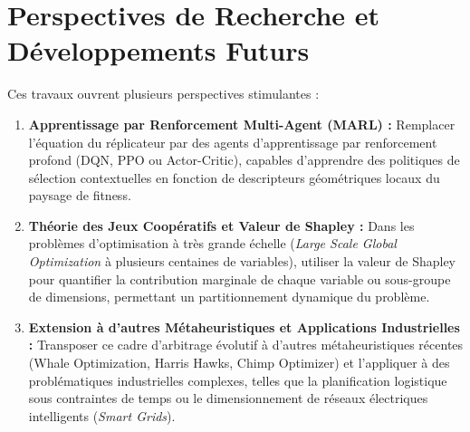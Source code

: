 \section{Perspectives de Recherche et Développements Futurs}
Ces travaux ouvrent plusieurs perspectives stimulantes :
\begin{enumerate}[label=\textbf{\arabic*.}]
    \item \textbf{Apprentissage par Renforcement Multi-Agent (MARL) :} Remplacer l'équation du réplicateur par des agents d'apprentissage par renforcement profond (DQN, PPO ou Actor-Critic), capables d'apprendre des politiques de sélection contextuelles en fonction de descripteurs géométriques locaux du paysage de fitness.
    \item \textbf{Théorie des Jeux Coopératifs et Valeur de Shapley :} Dans les problèmes d'optimisation à très grande échelle (\textit{Large Scale Global Optimization} à plusieurs centaines de variables), utiliser la valeur de Shapley pour quantifier la contribution marginale de chaque variable ou sous-groupe de dimensions, permettant un partitionnement dynamique du problème.
    \item \textbf{Extension à d'autres Métaheuristiques et Applications Industrielles :} Transposer ce cadre d'arbitrage évolutif à d'autres métaheuristiques récentes (Whale Optimization, Harris Hawks, Chimp Optimizer) et l'appliquer à des problématiques industrielles complexes, telles que la planification logistique sous contraintes de temps ou le dimensionnement de réseaux électriques intelligents (\textit{Smart Grids}).
\end{enumerate}
